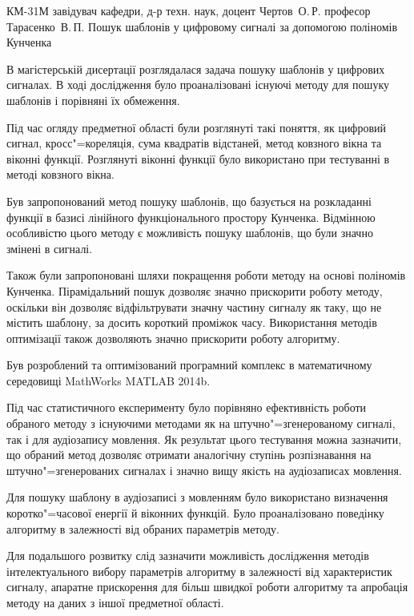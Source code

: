 \documentclass{thesis_utf8}
\begin{document}
    {КМ-31М}
    {завідувач кафедри, д-р техн. наук, доцент Чертов~О.\,Р.}
    {професор Тарасенко~В.\,П.}
    {Пошук шаблонів у цифровому сигналі за допомогою поліномів Кунченка}

\tableofcontents








\conclusions{}
В магістерській дисертації розглядалася задача пошуку шаблонів у цифрових сигналах.
В ході дослідження було проаналізовані існуючі методу для пошуку шаблонів і порівняні їх обмеження.

Під час огляду предметної області були розглянуті такі поняття, як цифровий сигнал, кросс"=кореляція, сума квадратів
відстаней, метод ковзного вікна та віконні функції.
Розглянуті віконні функції було використано при тестуванні в методі ковзного вікна.

Був запропонований метод пошуку шаблонів, що базується на розкладанні функції в базисі лінійного функціонального
простору Кунченка.
Відмінною особливістю цього методу є можливість пошуку шаблонів, що були значно змінені в сигналі.

Також були запропоновані шляхи покращення роботи методу на основі поліномів Кунченка.
Пірамідальний пошук дозволяє значно прискорити роботу методу, оскільки він дозволяє відфільтрувати значну частину
сигналу як таку, що не містить шаблону, за досить короткий проміжок часу.
Використання методів оптимізації також дозволяють значно прискорити роботу алгоритму.

Був розроблений та оптимізований програмний комплекс в математичному середовищі MathWorks MATLAB 2014b.

Під час статистичного експерименту було порівняно ефективність роботи обраного методу з існуючими методами як на
штучно"=згенерованому сигналі, так і для аудіозапису мовлення.
Як результат цього тестування можна зазначити, що обраний метод дозволяє отримати аналогічну ступінь розпізнавання на
штучно"=згенерованих сигналах і значно вищу якість на аудіозаписах мовлення.

Для пошуку шаблону в аудіозаписі з мовленням було використано визначення коротко"=часової енергії й віконних функцій.
Було проаналізовано поведінку алгоритму в залежності від обраних параметрів методу.

Для подальшого розвитку слід зазначити можливість дослідження методів інтелектуального вибору параметрів алгоритму в
залежності від характеристик сигналу, апаратне прискорення для більш швидкої роботи алгоритму та апробація методу на
даних з іншої предметної області.
\end{document}
